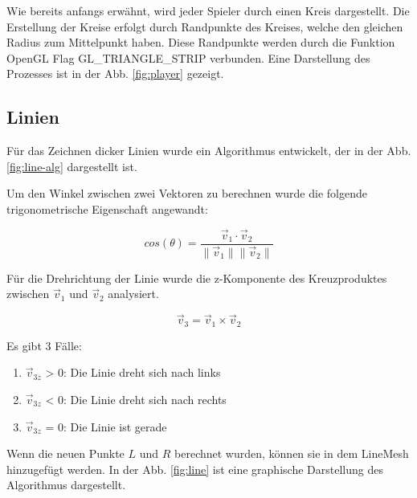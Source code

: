 \documentclass[doktyp=studarbeit]{TUBAFarbeiten}
\begin{document}
Wie bereits anfangs erwähnt, wird jeder Spieler durch einen Kreis dargestellt. 
Die Erstellung der Kreise erfolgt durch Randpunkte des Kreises, welche den gleichen Radius zum Mittelpunkt haben. Diese Randpunkte werden durch die Funktion OpenGL Flag GL\_TRIANGLE\_STRIP verbunden. Eine Darstellung des Prozesses
ist in der Abb. \ref{fig:player} gezeigt.

\FloatBarrier
\subsection{Linien}

Für das Zeichnen dicker Linien wurde ein Algorithmus entwickelt, der
in der Abb. \ref{fig:line-alg} dargestellt ist. 

Um den Winkel zwischen zwei Vektoren zu berechnen wurde die folgende 
trigonometrische Eigenschaft angewandt:

\begin{equation}
    cos(\theta)=
    \frac{\vec{v}_{1} \cdot \vec{v}_{2}}{
        \lVert \vec{v}_{1} \rVert 
        \lVert \vec{v}_{2} \rVert
    }
\end{equation}

Für die Drehrichtung der Linie wurde die z-Komponente des
Kreuzproduktes zwischen $\vec{v}_{1}$ und $\vec{v}_{2}$ analysiert.

\begin{equation}
    \vec{v}_{3} = \vec{v}_{1} \times \vec{v}_{2}
\end{equation}

Es gibt 3 Fälle:
\begin{enumerate}
    \item $\vec{v}_{3z}$ > 0: Die Linie dreht sich nach links
    \item $\vec{v}_{3z}$ < 0: Die Linie dreht sich nach rechts
    \item $\vec{v}_{3z}$ = 0: Die Linie ist gerade
\end{enumerate}

Wenn die neuen Punkte $L$ und $R$ berechnet wurden, können sie in dem LineMesh
hinzugefügt werden.
In der Abb. \ref{fig:line} ist eine graphische Darstellung des Algorithmus dargestellt.
\end{document}
